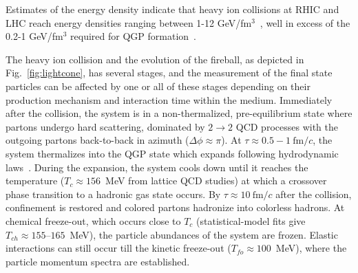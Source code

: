 Estimates of the energy density indicate that heavy ion collisions at RHIC and LHC  reach energy densities ranging between 1-12 GeV/fm$^3$~\cite{PhysRevC.93.024901,PhysRevC.94.034903}, well in excess of the 0.2-1 GeV/fm\(^3\) required for QGP formation~\cite{PhysRevD.90.094503,Karsch2002}. 
%

The heavy ion collision and the evolution of the fireball, as depicted in Fig.~\ref{fig:lightcone}, has several stages, and the measurement of the final state particles can be affected by one or all of these stages depending on their production mechanism and interaction time within the medium. 
%
Immediately after the collision, the system is in a non-thermalized, pre-equilibrium state where partons undergo hard scattering, dominated by \(2\to 2\) QCD processes with the outgoing partons back-to-back in azimuth (\(\Delta \phi \approx \pi\)). 
%
At \(\tau \approx 0.5 - 1~\text{fm}/c\), the system thermalizes into the QGP state which expands following hydrodynamic laws~\cite{Heinz_2013,Berges:2020fwq}.
%
During the expansion, the system cools down until it reaches the temperature (\(T_c \approx 156\)~MeV from lattice QCD studies) at which a crossover phase transition to a hadronic gas state occurs. 
%
By \(\tau \approx 10~\text{fm}/c\) after the collision, confinement is restored and colored partons hadronize into colorless hadrons.
%
At chemical freeze-out, which occurs close to \(T_c\) (statistical-model fits give \(T_{ch} \approx 155\text{--}165\)~MeV), the particle abundances of the system are frozen. 
%
Elastic interactions can still occur till the kinetic freeze-out (\(T_{fo} \approx 100\)~MeV), where the particle momentum spectra are established.


